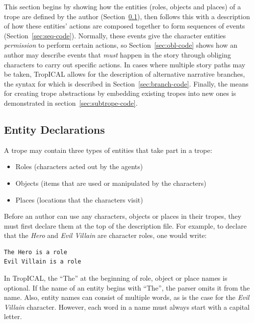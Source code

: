 \documentclass[11pt]{report}
\begin{document}

This section begins by showing how the entities (roles, objects and places) of a
trope are defined by the author (Section~\ref{sec:dec-code}), then follows this with a description of how
these entities' actions are composed together to form sequences of events (Section~\ref{sec:seq-code}).
Normally, these events give the character entities \emph{permission} to perform
certain actions, so Section~\ref{sec:obl-code} shows how an author may
describe events that \emph{must} happen in the story through obliging characters
to carry out specific actions.
In cases where multiple story paths may be taken, TropICAL allows for the
description of alternative narrative branches, the syntax for which is described
in Section~\ref{sec:branch-code}. Finally, the means for creating trope
abstractions by embedding existing tropes into new ones is demonstrated in
section~\ref{sec:subtrope-code}.

\subsection{Entity Declarations}
\label{sec:dec-code}
A trope may contain three types of entities that take part in a trope:

\begin{itemize}
  \item Roles (characters acted out by the agents)
  \item Objects (items that are used or manipulated by the characters)
  \item Places (locations that the characters visit)
\end{itemize}

Before an author can use any characters, objects or places in their tropes, they
must first declare them at the top of the description file. For example, to declare
that the \emph{Hero} and \emph{Evil Villain} are character roles, one would write:

\begin{lstlisting}[label={lst:dec-roles}, caption={Role declarations}]
The Hero is a role
Evil Villain is a role
\end{lstlisting}

In TropICAL, the ``The'' at the beginning of role, object or place names is
optional. If the name of an entity begins with ``The'', the parser
omits it from the name. Also, entity names can consist of multiple words, as is
the case for the \emph{Evil Villain} character. However, each word in a name must
always start with a capital letter.
\end{document}
